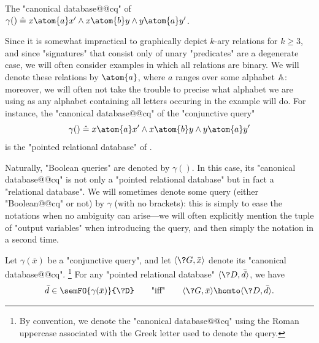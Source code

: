 \begin{marginfigure}
	\centering
	\caption{\AP\label{fig:prelim-db-ex-db}
	The "canonical database@@cq" of $\gamma() \defeq x \atom{a} x' \land x \atom{b} y \land y \atom{a} y'$.}
\end{marginfigure}
Since it is somewhat impractical to graphically depict $k$-ary relations for $k \geq 3$,
and since "signatures" that consist only of unary "predicates" are a degenerate case,
we will often consider examples in which all relations are binary.
We will denote these relations by $\atom{a}$, where $a$ ranges over some alphabet $\mathbb{A}$:
moreover, we will often not take the trouble to precise what alphabet we are using
as any alphabet containing all letters occuring in the example will do.
For instance, the "canonical database@@cq" of the "conjunctive query"
\[
	\gamma() \defeq x \atom{a} x' \land x \atom{b} y \land y \atom{a} y'
\]
is the "pointed relational database" of .

Naturally, "Boolean queries" are denoted by $\gamma()$.
In this case, its "canonical database@@cq" is not only a "pointed relational database" but
in fact a "relational database".
We will sometimes denote some query (either "Boolean@@cq" or not)
by $\gamma$ (with no brackets): this is simply to ease the notations when
no ambiguity can arise---we will often explicitly mention the tuple of "output variables"
when introducing the query, and then simply the notation in a second time.

\begin{proposition}[""Duality@@CQ""]
	\AP\label{prop:duality@@CQ}
	Let $\gamma(\bar x)$ be a "conjunctive query",
	and let $\tup{\?G, \bar x}$ denote its "canonical database@@cq".%
	\footnote{By convention, we denote the "canonical database@@cq" using the Roman
	uppercase associated with the Greek letter used to denote
	the query.}
	For any "pointed relational database" $\tup{\?D, \bar d}$,
	we have
	\[
		\bar d \in \semFO{\gamma(\bar x)}{\?D}
		\qquad\text{"iff"}\qquad
		\tup{\?G, \bar x} \homto \tup{\?D, \bar d}.
	\]
\end{proposition}

